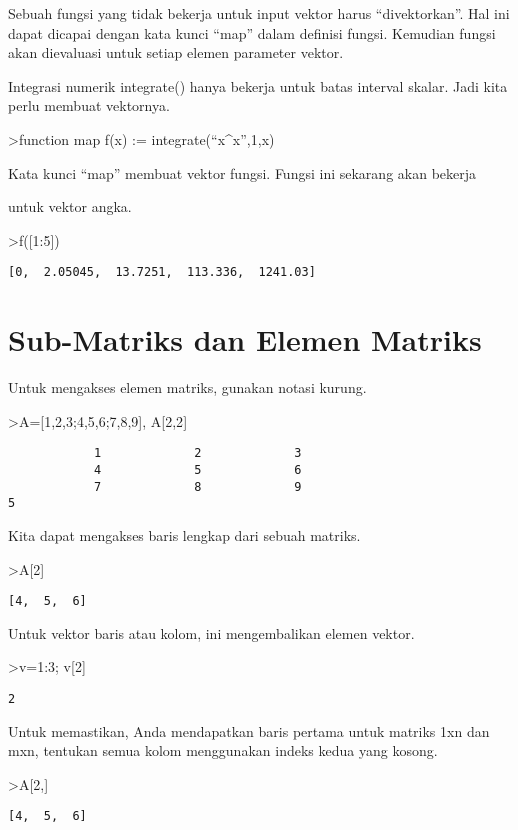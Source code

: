 \documentclass[
]{book}
\begin{document}
Sebuah fungsi yang tidak bekerja untuk input vektor harus ``divektorkan''. Hal ini dapat dicapai dengan kata kunci ``map'' dalam definisi fungsi. Kemudian fungsi akan dievaluasi untuk setiap elemen parameter vektor.

Integrasi numerik integrate() hanya bekerja untuk batas interval skalar. Jadi kita perlu membuat vektornya.

\textgreater function map f(x) := integrate(``x\^{}x'',1,x)

Kata kunci ``map'' membuat vektor fungsi. Fungsi ini sekarang akan bekerja

untuk vektor angka.

\textgreater f({[}1:5{]})

\begin{verbatim}
[0,  2.05045,  13.7251,  113.336,  1241.03]
\end{verbatim}

\chapter{Sub-Matriks dan Elemen Matriks}\label{sub-matriks-dan-elemen-matriks}

Untuk mengakses elemen matriks, gunakan notasi kurung.

\textgreater A={[}1,2,3;4,5,6;7,8,9{]}, A{[}2,2{]}

\begin{verbatim}
            1             2             3 
            4             5             6 
            7             8             9 
5
\end{verbatim}

Kita dapat mengakses baris lengkap dari sebuah matriks.

\textgreater A{[}2{]}

\begin{verbatim}
[4,  5,  6]
\end{verbatim}

Untuk vektor baris atau kolom, ini mengembalikan elemen vektor.

\textgreater v=1:3; v{[}2{]}

\begin{verbatim}
2
\end{verbatim}

Untuk memastikan, Anda mendapatkan baris pertama untuk matriks 1xn dan mxn, tentukan semua kolom menggunakan indeks kedua yang kosong.

\textgreater A{[}2,{]}

\begin{verbatim}
[4,  5,  6]
\end{verbatim}
\end{document}
